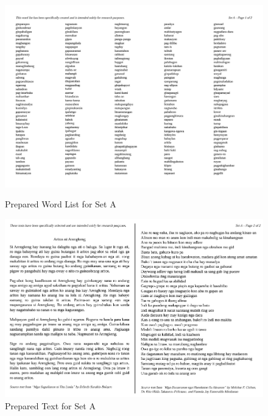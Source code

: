 \begin{figure}[h!]
	\centering
	\includegraphics[width=\textwidth]{./appendix/setA1.png}
	\caption{Prepared Word List for Set A}
	\includegraphics[width=\textwidth]{./appendix/setA2.png}
	\caption{Prepared Text for Set A}
	\label{fig:setA}
\end{figure}

